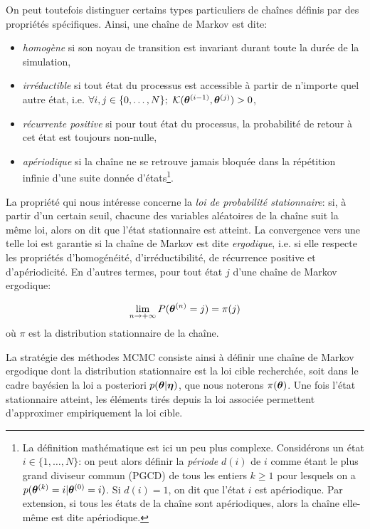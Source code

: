 On peut toutefois distinguer certains types particuliers de chaînes définis par des propriétés spécifiques. Ainsi, une chaîne de Markov est dite:
\begin{itemize}
	\item \textit{homogène} si son noyau de transition est invariant durant toute la durée de la simulation,
	\item \textit{irréductible} si tout état du processus est accessible à partir de n'importe quel autre état, i.e. $\forall i,j \in \{0,\dots,N\}; ~ {\mathcal{K}}({{\bm{\theta}}^{(i-1)}}, {\bm{\theta}}^{(j)}) > 0$,
	\item \textit{récurrente positive} si pour tout état du processus, la probabilité de retour à cet état est toujours non-nulle,
	\item \textit{apériodique} si la chaîne ne se retrouve jamais bloquée dans la répétition infinie d'une suite donnée d'états\footnote{La définition mathématique est ici un peu plus complexe. Considérons un état $i \in \{1, \dots, N\}$: on peut alors définir la \textit{période} $d(i)$ de $i$ comme étant le plus grand diviseur commun (PGCD) de tous les entiers $k \geq 1$ pour lesquels on a $p({\bm{\theta}}^{(k)} = i | {\bm{\theta}}^{(0)} = i)$. Si $d(i) = 1$, on dit que l'état $i$ est apériodique. Par extension, si tous les états de la chaîne sont apériodiques, alors la chaîne elle-même est dite apériodique.}.\\
\end{itemize}

La propriété qui nous intéresse concerne la \textit{loi de probabilité stationnaire}: si, à partir d'un certain seuil, chacune des variables aléatoires de la chaîne suit la même loi, alors on dit que l'état stationnaire est atteint. La convergence vers une telle loi est garantie si la chaîne de Markov est dite \textit{ergodique}, i.e. si elle respecte les propriétés d'homogénéité, d'irréductibilité, de récurrence positive et d'apériodicité. En d'autres termes, pour tout état $j$ d'une chaîne de Markov ergodique:

\begin{equation}
\lim_{n \rightarrow + \infty} P({\bm{\theta}}^{(n)} = j) = \pi(j)
\label{eq_definition_loi_stationnaire}
\end{equation}
où $\pi$ est la distribution stationnaire de la chaîne. 


La stratégie des méthodes MCMC consiste ainsi à définir une chaîne de Markov ergodique dont la distribution stationnaire est la loi cible recherchée, soit dans le cadre bayésien la loi a posteriori ${p({\bm{\theta}} | {\bm{\eta}})}$, que nous noterons $\pi({\bm{\theta}})$. Une fois l'état stationnaire atteint, les éléments tirés depuis la loi associée permettent d'approximer {empiriquement} la loi cible.

